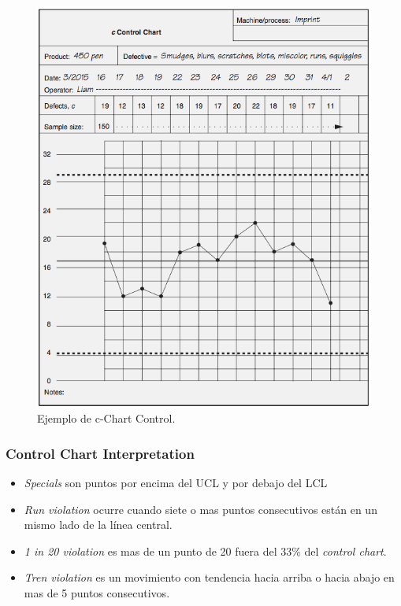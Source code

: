 \documentclass[]{article}
\begin{document}
\begin{figure}[H]
	\centering
	\includegraphics[width=120mm]{imagenes/cChartEjemplo.png}
	\caption{Ejemplo de c-Chart Control.}
	\label{fig:cChartEjemplo}
\end{figure}

\subsubsection{Control Chart Interpretation}

\begin{itemize}
	\item \textit{Specials} son puntos por encima del UCL y por debajo del LCL
	\item \textit{Run violation} ocurre cuando siete o mas puntos consecutivos están en un mismo lado de la línea central.
	\item \textit{1 in 20 violation} es mas de un punto de 20 fuera del 33\% del \textit{control chart}.
	\item \textit{Tren violation} es un movimiento con tendencia hacia arriba o hacia abajo en mas de 5 puntos consecutivos.
\end{itemize}
\end{document}
